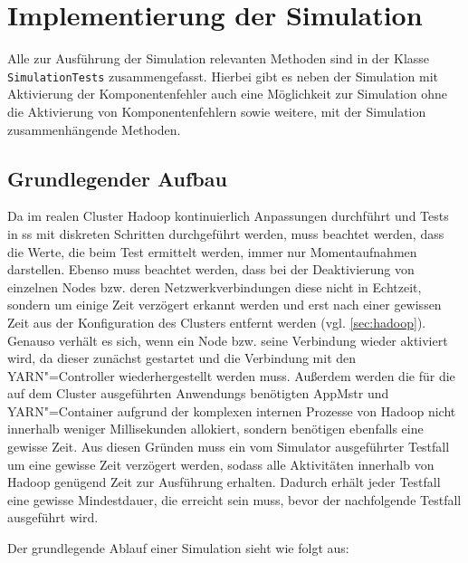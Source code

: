 \section{Implementierung der Simulation}
\label{sec:implSimulation}

Alle zur Ausführung der Simulation relevanten Methoden sind in der Klasse \texttt{SimulationTests} zusammengefasst.
Hierbei gibt es neben der Simulation mit Aktivierung der Komponentenfehler auch eine Möglichkeit zur Simulation ohne die Aktivierung von Komponentenfehlern sowie weitere, mit der Simulation zusammenhängende Methoden.

\subsection{Grundlegender Aufbau}
\label{subsec:simulationBasics}

Da im realen Cluster Hadoop kontinuierlich Anpassungen durchführt und \glspl{Test} in \gls{ss} mit diskreten Schritten durchgeführt werden, muss beachtet werden, dass die Werte, die beim \gls{Test} ermittelt werden, immer nur Momentaufnahmen darstellen.
Ebenso muss beachtet werden, dass bei der Deaktivierung von einzelnen Nodes bzw. deren Netzwerkverbindungen diese nicht in Echtzeit, sondern um einige Zeit verzögert erkannt werden und erst nach einer gewissen Zeit aus der Konfiguration des Clusters entfernt werden (vgl. \cref{sec:hadoop}).
Genauso verhält es sich, wenn ein Node bzw. seine Verbindung wieder aktiviert wird, da dieser zunächst gestartet und die Verbindung mit den YARN"=Controller wiederhergestellt werden muss.
Außerdem werden die für die auf dem Cluster ausgeführten \glspl{Anwendung} benötigten \gls{AppMstr} und YARN"=Container aufgrund der komplexen internen Prozesse von Hadoop nicht innerhalb weniger Millisekunden allokiert, sondern benötigen ebenfalls eine gewisse Zeit.
Aus diesen Gründen muss ein vom Simulator ausgeführter Testfall um eine gewisse Zeit verzögert werden, sodass alle Aktivitäten innerhalb von Hadoop genügend Zeit zur Ausführung erhalten.
Dadurch erhält jeder Testfall eine gewisse Mindestdauer, die erreicht sein muss, bevor der nachfolgende Testfall ausgeführt wird.

Der grundlegende Ablauf einer Simulation sieht wie folgt aus:

